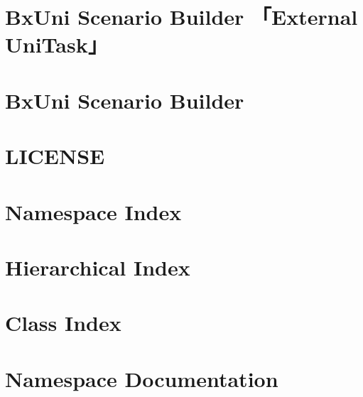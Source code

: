 \documentclass[twoside]{book}
\newcommand{\+}{\discretionary{\mbox{\scriptsize$\hookleftarrow$}}{}{}}
\begin{document}
\begin{CJK}{UTF8}{min}
\chapter{Bx\+Uni Scenario Builder 「\+External Uni\+Task」}
\label{md__c__home_murakami__b_x_tools__github__bx_uni__scenario_builder__packages__bx_uni__scenario_bu3f6d76beb419751b0b258cab5cc21abe}

\chapter{Bx\+Uni Scenario Builder}
\label{md__c__home_murakami__b_x_tools__github__bx_uni__scenario_builder__packages__bx_uni__scenario_builder__documents__index}

\chapter{LICENSE}
\label{md__c__home_murakami__b_x_tools__github__bx_uni__scenario_builder__packages__bx_uni__scenario_builder__l_i_c_e_n_s_e}

\chapter{Namespace Index}

\chapter{Hierarchical Index}

\chapter{Class Index}

\chapter{Namespace Documentation}






\end{CJK}
\end{document}
